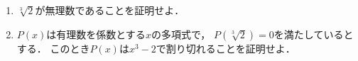 \documentclass[../../main.tex]{subfiles}
\begin{document}
\begin{enumerate}
  \item $\sqrt[3]{2}$が無理数であることを証明せよ．
  \item $P(x)$は有理数を係数とする$x$の多項式で，
    $P(\sqrt[3]{2})=0$を満たしているとする．
    このとき$P(x)$は$x^3-2$で割り切れることを証明せよ．
\end{enumerate}
\end{document}
